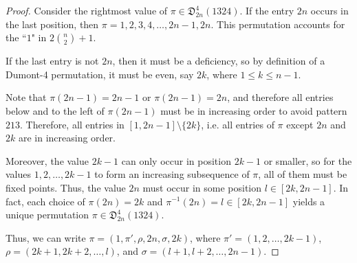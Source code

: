 \documentclass[
final
]{dmtcs-episciences}
\theoremstyle{definition}
\theoremstyle{remark}
\begin{document}
\begin{proof}
Consider the rightmost value of $\pi\in\mathfrak{D}^4_{2n}(1324)$. If the entry $2n$ occurs in the last position, then $\pi = 1,2,3,4,\dots,2n-1,2n$.  This permutation accounts for the ``$1$" in $2\binom{n}{2} + 1$.

If the last entry is not $2n$, then it must be a deficiency, so by definition of a Dumont-4 permutation, it must be even, say $2k$, where $1 \le k \le n-1$. 

Note that $\pi(2n-1)=2n-1$ or $\pi(2n-1)=2n$, and therefore all entries below and to the left of $\pi(2n-1)$ must be in increasing order to avoid pattern $213$. Therefore, all entries in $[1,2n-1]\setminus\{2k\}$, i.e. all entries of $\pi$ except $2n$ and $2k$ are in increasing order.

Moreover, the value $2k-1$ can only occur in position $2k-1$ or smaller, so for the values $1,2,\dots,2k-1$ to form an increasing subsequence of $\pi$, all of them must be fixed points. Thus, the value $2n$ must occur in some position $l\in[2k,2n-1]$. In fact, each choice of $\pi(2n)=2k$ and $\pi^{-1}(2n)=l\in[2k,2n-1]$ yields a unique permutation $\pi\in\mathfrak{D}^4_{2n}(1324)$.

Thus, 
we can write $\pi=(1,\pi',\rho,2n,\sigma,2k)$, where $\pi'= (1, 2, \dots, 2k-1)$, $\rho=(2k+1, 2k+2, \dots, l)$, and $\sigma=(l+1,l+2, \dots, 2n-1)$.



\end{proof}
\end{document}
